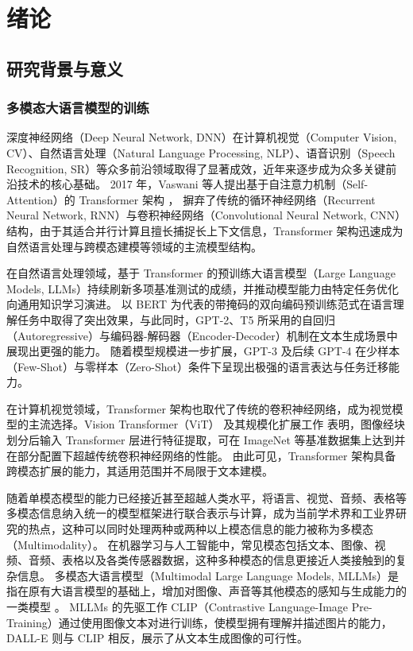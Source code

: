 \chapter{绪论}

\section{研究背景与意义}
\label{sec:chap1-background}

\subsection{多模态大语言模型的训练}

深度神经网络（Deep Neural Network, DNN）在计算机视觉（Computer Vision, CV）、自然语言处理（Natural Language Processing, NLP）、语音识别（Speech Recognition, SR）等众多前沿领域取得了显著成效，近年来逐步成为众多关键前沿技术的核心基础\cite{galvatron2022}。
2017 年，Vaswani 等人提出基于自注意力机制（Self-Attention）的 Transformer 架构%
\cite{vaswani2017}，
摒弃了传统的循环神经网络（Recurrent Neural Network, RNN）与卷积神经网络（Convolutional Neural Network, CNN）结构，由于其适合并行计算且擅长捕捉长上下文信息，Transformer 架构迅速成为自然语言处理与跨模态建模等领域的主流模型结构。

在自然语言处理领域，基于 Transformer 的预训练大语言模型（Large Language Models, LLMs）持续刷新多项基准测试的成绩，并推动模型能力由特定任务优化向通用知识学习演进。
以 BERT\cite{bert} 为代表的带掩码的双向编码预训练范式在语言理解任务中取得了突出效果，与此同时，GPT-2\cite{gpt2}、T5\cite{t5} 所采用的自回归（Autoregressive）与编码器-解码器（Encoder-Decoder）机制在文本生成场景中展现出更强的能力。
随着模型规模进一步扩展，GPT-3\cite{brown2020gpt3} 及后续 GPT-4\cite{openai2023} 在少样本（Few-Shot）与零样本（Zero-Shot）条件下呈现出极强的语言表达与任务迁移能力。

在计算机视觉领域，Transformer 架构也取代了传统的卷积神经网络，成为视觉模型的主流选择。Vision Transformer（ViT）\cite{vit2020} 及其规模化扩展工作\cite{scaling_vit} 表明，图像经块划分后输入 Transformer 层进行特征提取，可在 ImageNet 等基准数据集上达到并在部分配置下超越传统卷积神经网络的性能。
由此可见，Transformer 架构具备跨模态扩展的能力，其适用范围并不局限于文本建模。

随着单模态模型的能力已经接近甚至超越人类水平，将语言、视觉、音频、表格等多模态信息纳入统一的模型框架进行联合表示与计算，成为当前学术界和工业界研究的热点，这种可以同时处理两种或两种以上模态信息的能力被称为多模态（Multimodality）。
在机器学习与人工智能中，常见模态包括文本、图像、视频、音频、表格以及各类传感器数据，这种多种模态的信息更接近人类接触到的复杂信息。
多模态大语言模型（Multimodal Large Language Models, MLLMs）是指在原有大语言模型的基础上，增加对图像、声音等其他模态的感知与生成能力的一类模型%
\cite{blip2,llava2023,flamingo2022}。
MLLMs 的先驱工作 CLIP\cite{clip2021}（Contrastive Language-Image Pre-Training）通过使用图像文本对进行训练，使模型拥有理解并描述图片的能力，DALL-E\cite{dalle2021} 则与 CLIP 相反，展示了从文本生成图像的可行性。

